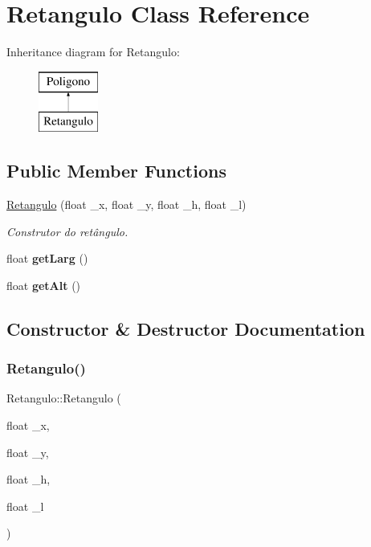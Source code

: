 \hypertarget{class_retangulo}{}\section{Retangulo Class Reference}
\label{class_retangulo}
Inheritance diagram for Retangulo\+:\begin{figure}[H]
\begin{center}
\leavevmode
\includegraphics[height=2.000000cm]{class_retangulo}
\end{center}
\end{figure}
\subsection*{Public Member Functions}
\begin{DoxyCompactItemize}
\item 
\mbox{\hyperlink{class_retangulo_a9e3938e017496d9448e78462298c862d}{Retangulo}} (float \+\_\+x, float \+\_\+y, float \+\_\+h, float \+\_\+l)
\begin{DoxyCompactList}\small\item\em Construtor do retângulo. \end{DoxyCompactList}\item 
\mbox{\label{class_retangulo_a0ed47c5a3ea94b51d825ceac1fdc6190}} 
float {\bfseries get\+Larg} ()
\item 
\mbox{\label{class_retangulo_a3476d0f0494520c8fbd7003ea6b1d343}} 
float {\bfseries get\+Alt} ()
\end{DoxyCompactItemize}


\subsection{Constructor \& Destructor Documentation}
\mbox{\label{class_retangulo_a9e3938e017496d9448e78462298c862d}} 
\subsubsection{\texorpdfstring{Retangulo()}{Retangulo()}}
{\footnotesize\ttfamily Retangulo\+::\+Retangulo (\begin{DoxyParamCaption}\item[{float}]{\+\_\+x,  }\item[{float}]{\+\_\+y,  }\item[{float}]{\+\_\+h,  }\item[{float}]{\+\_\+l }\end{DoxyParamCaption})}



